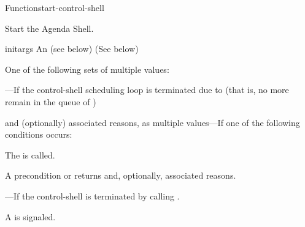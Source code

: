\documentclass[10pt,twoside,english,pdftex]{article}
\begin{document}
\begin{functiondoc}{Function}{start-control-shell}%
  { 
    \returns{} \superstar}
%
%
%
%

\fnsyntax

\fnpurpose Start the Agenda Shell.

\fnpackage {}

\fnmodule {}

\fnargs
\begin{args}{initargs}
\arg[initargs] An  (see below)
\arg[results] (See below)
\end{args}

\fnreturns
One of the following sets of multiple values: 

\begin{tightitemize}
\item {}---If the control-shell scheduling loop is terminated
  due to  (that is, no more  remain
  in the queue of )
\item {} and (optionally) associated reasons, as multiple
  values---If one of the following conditions occurs:
\begin{tightitemize}
\item The   is
  called.
\item A precondition  or  
  returns  and, optionally, associated reasons.
\end{tightitemize}
\item {}---If the control-shell is terminated by
  calling .
\end{tightitemize}

\fnevents
{}%
%
%
%
%
%
A  is signaled.
 
\fnerrors
\threadsnotstarted


\end{functiondoc}
\end{document}
